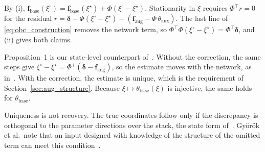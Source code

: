 \begin{IEEEproof}
By (i), $\mathbf f_{\mathrm{base}}(\xi^\circ)=\mathbf f_{\mathrm{base}}(\xi^\star)
+\Phi(\xi^\circ-\xi^\star)$.
Stationarity in $\xi$ requires $\Phi^\top r=0$ for the residual
$r=\bm\delta-\Phi(\xi^\circ-\xi^\star)
-(\mathbf f_{\mathrm{aug}}-\Phi\,\theta_{\mathrm{aux}})$.
The last line of \eqref{eq:obc_construction} removes the network term, so
$\Phi^\top\Phi(\xi^\circ-\xi^\star)=\Phi^\top\bm\delta$, and (ii) gives both
claims.
\end{IEEEproof}

Proposition~1 is our state-level counterpart
of~\cite[Thm.~7, Eq.~(21)]{gyorok2026obc}.
Without the correction, the same steps give
$\xi^\circ-\xi^\star=\Phi^+(\bm\delta-\mathbf f_{\mathrm{aug}})$, so the
estimate moves with the network, as in~\cite[Sec.~4.2]{gyorok2026obc}.
With the correction, the estimate is unique, which is the requirement of
Section~\ref{sec:aug_structure}.
Because $\xi\mapsto\theta_{\mathrm{base}}(\xi)$ is injective, the same holds
for $\theta_{\mathrm{base}}$.

Uniqueness is not recovery.
The true coordinates follow only if the discrepancy is orthogonal to the
parameter directions over the stack, the state form
of~\cite[Cond.~4]{gyorok2026obc}.
Gy\"or\"ok et al.\ note that an input designed with knowledge of the
structure of the omitted term can meet this condition~\cite[Remark~5]{gyorok2026obc}.

